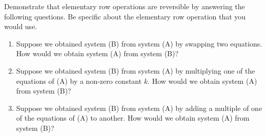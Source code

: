 \documentclass{ximera}
\begin{document}



 \begin{problem}\label{prob:elemrowopsreverse}
 Demonstrate that elementary row operations are reversible by answering the following questions.  Be specific about the elementary row operation that you would use.
\begin{enumerate}
 \item Suppose we obtained system (B) from system (A) by swapping two equations. How would we obtain system (A) from system (B)?
 \item Suppose we obtained system (B) from system (A) by multiplying one of the equations of (A) by a non-zero constant $k$.  How would we obtain system (A) from system (B)?
 \item Suppose we obtained system (B) from system (A) by adding a multiple of one of the equations of (A) to  another.  How would we obtain system (A) from system (B)?
 \end{enumerate}
 \end{problem}
\end{document}
